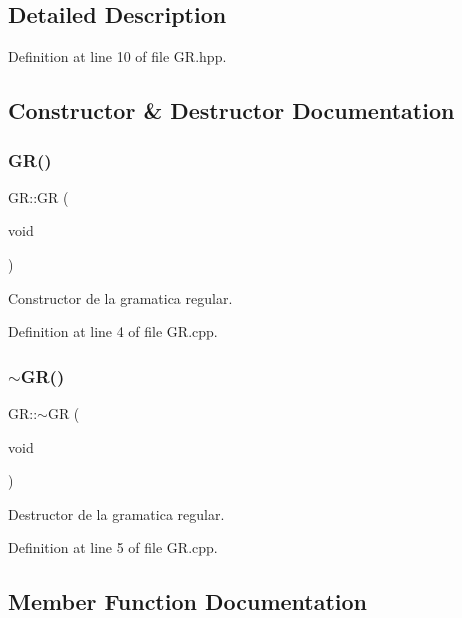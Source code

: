 \subsection{Detailed Description}


Definition at line 10 of file G\+R.\+hpp.



\subsection{Constructor \& Destructor Documentation}
\mbox{\label{class_g_r_a44cfd47b23f3a406312fc79165459e9d}} 
\subsubsection{\texorpdfstring{G\+R()}{GR()}}
{\footnotesize\ttfamily G\+R\+::\+GR (\begin{DoxyParamCaption}\item[{void}]{ }\end{DoxyParamCaption})}



Constructor de la gramatica regular. 



Definition at line 4 of file G\+R.\+cpp.

\mbox{\label{class_g_r_a60a1df45425dce1a14e0ad5b8677b8fa}} 
\subsubsection{\texorpdfstring{$\sim$\+G\+R()}{~GR()}}
{\footnotesize\ttfamily G\+R\+::$\sim$\+GR (\begin{DoxyParamCaption}\item[{void}]{ }\end{DoxyParamCaption})}



Destructor de la gramatica regular. 



Definition at line 5 of file G\+R.\+cpp.



\subsection{Member Function Documentation}
\mbox{\label{class_g_r_a316145725ac4ad4acbf7fe9a3f4740bb}} 
